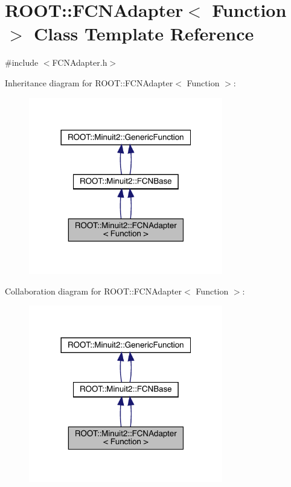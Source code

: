 \hypertarget{classROOT_1_1Minuit2_1_1FCNAdapter}{}\section{R\+O\+OT\+:\+:F\+C\+N\+Adapter$<$ Function $>$ Class Template Reference}
\label{classROOT_1_1Minuit2_1_1FCNAdapter}


{\ttfamily \#include $<$F\+C\+N\+Adapter.\+h$>$}



Inheritance diagram for R\+O\+OT\+:\+:F\+C\+N\+Adapter$<$ Function $>$\+:\nopagebreak
\begin{figure}[H]
\begin{center}
\leavevmode
\includegraphics[width=240pt]{d8/dc9/classROOT_1_1Minuit2_1_1FCNAdapter__inherit__graph}
\end{center}
\end{figure}


Collaboration diagram for R\+O\+OT\+:\+:F\+C\+N\+Adapter$<$ Function $>$\+:\nopagebreak
\begin{figure}[H]
\begin{center}
\leavevmode
\includegraphics[width=240pt]{d2/d35/classROOT_1_1Minuit2_1_1FCNAdapter__coll__graph}
\end{center}
\end{figure}
